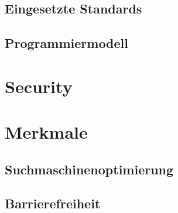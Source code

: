   \subsection{Eingesetzte Standards}
  
  \subsection{Programmiermodell}
  
  \section{Security}
  
  \section{Merkmale}
    
  \subsection{Suchmaschinenoptimierung}
  
  \subsection{Barrierefreiheit}